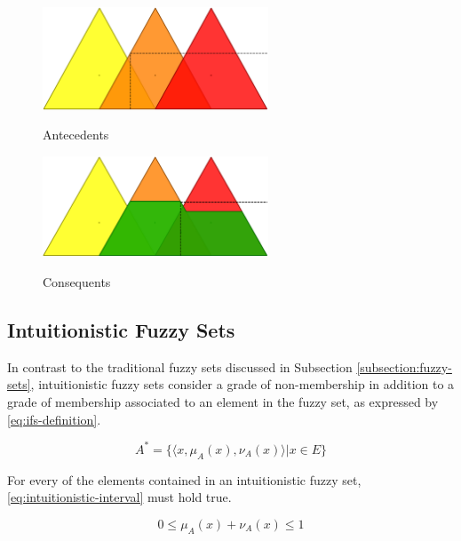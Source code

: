 \documentclass[review]{elsarticle}
\begin{document}
\begin{figure}
\caption{Antecedents}
\centering
\includegraphics[width=0.6\textwidth]{img/antecedents.png}
\label{figure:antecedents}
\end{figure}

\begin{figure}
\caption{Consequents}
\centering
\includegraphics[width=0.6\textwidth]{img/consequents.png}
\label{figure:consequents}
\end{figure}

\subsection{Intuitionistic Fuzzy Sets}
\label{subsection:intuitionistic-fuzzy-sets}

In contrast to the traditional fuzzy sets discussed in Subsection
\ref{subsection:fuzzy-sets}, intuitionistic fuzzy sets consider a grade of
non-membership in addition to a grade of membership associated to an element in
the fuzzy set, as expressed by \ref{eq:ifs-definition}.

\begin{equation}
  \label{eq:ifs-definition}
  A^{*} = \{\langle x, \mu _{A} (x), \nu _{A} (x) \rangle | x \in E\}
\end{equation}

For every of the elements contained in an intuitionistic fuzzy set,
\ref{eq:intuitionistic-interval} must hold true.

\begin{equation}
  \label{eq:intuitionistic-interval}
  0 \leq \mu_{A}(x) + \nu_{A}(x) \leq 1
\end{equation}
\end{document}
